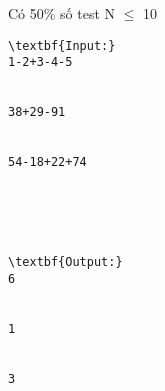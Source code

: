 Có 50\% số test N  $\le$  10
\begin{verbatim}
\textbf{Input:}
1-2+3-4-5


38+29-91


54-18+22+74





\textbf{Output:}
6


1


3 \end{verbatim}